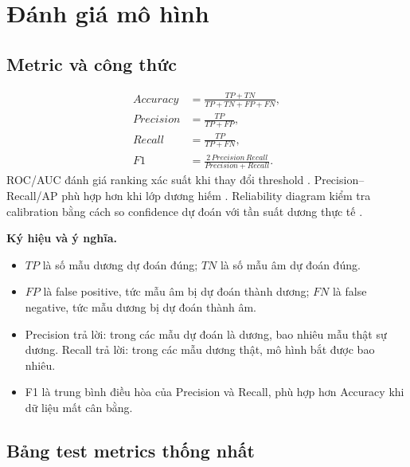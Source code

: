 \documentclass[12pt,a4paper]{article}
\begin{document}
\section{Đánh giá mô hình}

\subsection{Metric và công thức}

\begin{align}
 Accuracy &= \frac{TP+TN}{TP+TN+FP+FN}, \\
 Precision &= \frac{TP}{TP+FP}, \\
 Recall &= \frac{TP}{TP+FN}, \\
 F1 &= \frac{2\,Precision\,Recall}{Precision+Recall}.
\end{align}
ROC/AUC đánh giá ranking xác suất khi thay đổi threshold \cite{fawcett2006}. Precision--Recall/AP phù hợp hơn khi lớp dương hiếm \cite{davis2006}. Reliability diagram kiểm tra calibration bằng cách so confidence dự đoán với tần suất dương thực tế \cite{niculescu2005}.

\textbf{Ký hiệu và ý nghĩa.}
\begin{itemize}
  \item $TP$ là số mẫu dương dự đoán đúng; $TN$ là số mẫu âm dự đoán đúng.
  \item $FP$ là false positive, tức mẫu âm bị dự đoán thành dương; $FN$ là false negative, tức mẫu dương bị dự đoán thành âm.
  \item Precision trả lời: trong các mẫu dự đoán là dương, bao nhiêu mẫu thật sự dương. Recall trả lời: trong các mẫu dương thật, mô hình bắt được bao nhiêu.
  \item F1 là trung bình điều hòa của Precision và Recall, phù hợp hơn Accuracy khi dữ liệu mất cân bằng.
\end{itemize}

\subsection{Bảng test metrics thống nhất}
\end{document}
